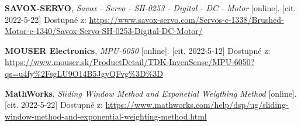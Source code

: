 \documentclass[12pt,fleqn,a4paper,oneside]{mybook} %
\theoremstyle{definition}
\begin{document}
\begin{thebibliography}{10}
	\textbf{SAVOX-SERVO}, \textit{Savox - Servo - SH-0253 - Digital - DC - Motor } [online]. [cit. 2022-5-22] Dostupné z:
	\url{https://www.savox-servo.com/Servos-c-1338/Brushed-Motor-c-1340/Savox-Servo-SH-0253-Digital-DC-Motor/}
	
	
	\textbf{MOUSER Electronics}, \textit{MPU-6050} [online]. [cit. 2022-5-12] Dostupné z:
	\url{https://www.mouser.sk/ProductDetail/TDK-InvenSense/MPU-6050?qs=u4fy%2FsgLU9O14B5JgyQFvg%3D%3D}
	
	\textbf{MathWorks}, \textit{Sliding Window Method and Exponetial Weigthing Method} [online]. [cit. 2022-5-22] Dostupné z:
	\url{https://www.mathworks.com/help/dsp/ug/sliding-window-method-and-exponential-weighting-method.html}
	
	
\end{thebibliography}
\end{document}
